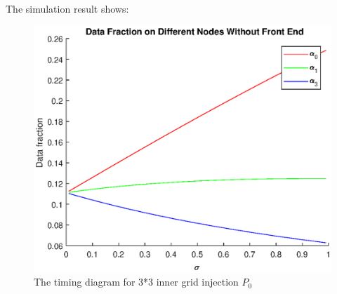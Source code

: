 The simulation result shows:
\begin{figure}[!ht]
\centering
\includegraphics[width=1\columnwidth]{figure/4t4i_no_fraction.eps}
\caption{The timing diagram for 3*3 inner grid injection $P_{0}$ }
\label{fig:4t4i_no_fraction}
\end{figure}
\newpage